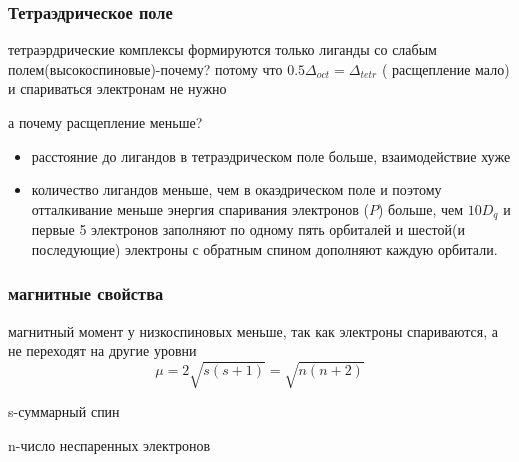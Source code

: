\subsubsection*{Тетраэдрическое поле}
тетраэрдрические комплексы формируются только лиганды со слабым полем(высокоспиновые)-почему? потому что $0.5\Delta_{oct}=\Delta_{tetr}$ ( расщепление мало) и спариваться электронам не нужно

а почему расщепление меньше?
\begin{itemize}
\item расстояние до лигандов в тетраэдрическом поле больше, взаимодействие хуже 
\item количество лигандов меньше, чем в окаэдрическом поле и поэтому отталкивание меньше энергия спаривания электронов ($P$) больше, чем $10D_q$ и первые 5 электронов заполняют по одному пять орбиталей и шестой(и последующие) электроны с обратным спином дополняют каждую орбитали. 
\end{itemize}

\subsubsection{магнитные свойства}
 магнитный момент у низкоспиновых меньше, так как электроны спариваются, а не переходят на другие уровни 
$$\mu=2\sqrt{s(s+1)}=\sqrt{n(n+2)}$$ 

s-суммарный спин 

n-число неспаренных электронов 

